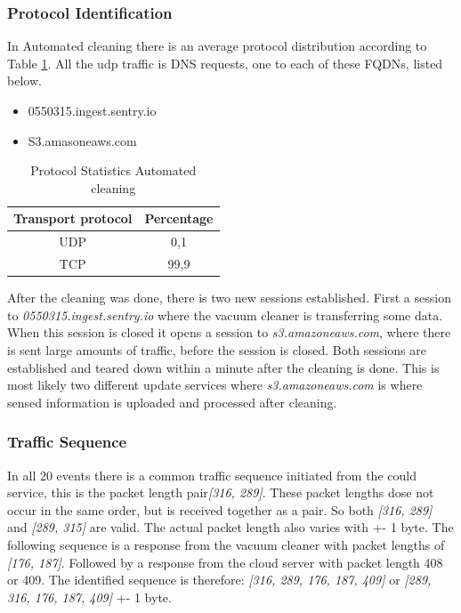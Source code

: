 \subsubsection{Protocol Identification}
In Automated cleaning there is an average protocol distribution according to Table \ref{tab:acanalysisdist}. All the udp traffic is DNS requests, one to each of these FQDNs, listed below.

\begin{itemize}
    \item 0550315.ingest.sentry.io
    \item S3.amasoneaws.com
\end{itemize}

\begin{table}[H]
\centering
\caption{Protocol Statistics Automated cleaning}
\label{tab:acanalysisdist}
\begin{tabular}{|c|c|}
\hline
\textbf{Transport protocol} & \textbf{Percentage} \\ \hline
UDP                         & 0,1                 \\ \hline
TCP                         & 99,9                \\ \hline
\end{tabular}
\end{table}

After the cleaning was done, there is two new sessions established. First a session to \textit{0550315.ingest.sentry.io} where the vacuum cleaner is transferring some data. When this session is closed it opens a session to \textit{s3.amazoneaws.com}, where there is sent large amounts of traffic, before the session is closed. Both sessions are established and teared down within a minute after the cleaning is done. This is most likely two different update services where \textit{s3.amazoneaws.com} is where sensed information is uploaded and processed after cleaning.

\subsubsection{Traffic Sequence}
In all 20 events there is a common traffic sequence initiated from the could service, this is the packet length pair\textit{[316, 289]}. These packet lengths dose not occur in the same order, but is received together as a pair. So both \textit{[316, 289]} and \textit{[289, 315]} are valid. The actual packet length also varies with +- 1 byte. 
The following sequence is a response from the vacuum cleaner with packet lengths of \textit{[176, 187]}. Followed by a response from the cloud server with packet length 408 or 409. The identified sequence is therefore: \textit{[316, 289, 176, 187, 409]} or \textit{[289, 316, 176, 187, 409]} +- 1 byte.

